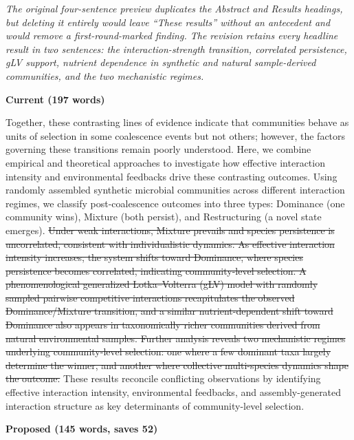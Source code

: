 \documentclass[11pt,a4paper]{article}
\newcommand{\cutx}[1]{{\color{CutRed}\sout{#1}}}
\newcommand{\rationale}[1]{{\color{GrayNote}\small\textit{#1}}\par\smallskip}
\newcommand{\panel}[1]{\par\smallskip\noindent\textbf{\small #1}\par}
\begin{document}
\rationale{The original four-sentence preview duplicates the Abstract and Results headings, but deleting it entirely would leave ``These results'' without an antecedent and would remove a first-round-marked finding. The revision retains every headline result in two sentences: the interaction-strength transition, correlated persistence, gLV support, nutrient dependence in synthetic and natural sample-derived communities, and the two mechanistic regimes.}
\panel{Current (197 words)}
Together, these contrasting lines of evidence indicate that communities behave as units of selection in some coalescence events but not others; however, the factors governing these transitions remain poorly understood. Here, we combine empirical and theoretical approaches to investigate how effective interaction intensity and environmental feedbacks drive these contrasting outcomes. Using randomly assembled synthetic microbial communities across different interaction regimes, we classify post-coalescence outcomes into three types: Dominance (one community wins), Mixture (both persist), and Restructuring (a novel state emerges). \cutx{Under weak interactions, Mixture prevails and species persistence is uncorrelated, consistent with individualistic dynamics. As effective interaction intensity increases, the system shifts toward Dominance, where species persistence becomes correlated, indicating community-level selection. A phenomenological generalized Lotka--Volterra (gLV) model with randomly sampled pairwise competitive interactions recapitulates the observed Dominance/Mixture transition, and a similar nutrient-dependent shift toward Dominance also appears in taxonomically richer communities derived from natural environmental samples. Further analysis reveals two mechanistic regimes underlying community-level selection: one where a few dominant taxa largely determine the winner, and another where collective multi-species dynamics shape the outcome. }These results reconcile conflicting observations by identifying effective interaction intensity, environmental feedbacks, and assembly-generated interaction structure as key determinants of community-level selection.
\panel{Proposed (145 words, saves 52)}
\end{document}

